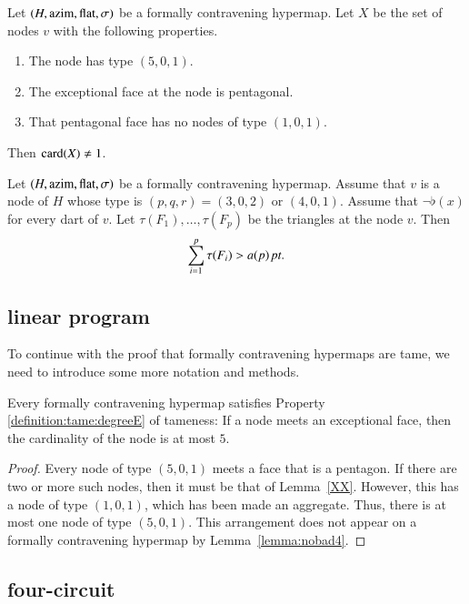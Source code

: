 \begin{lemma}
Let $(H,{\operatorname{azim}},\operatorname{flat},\sigma)$ be a formally contravening hypermap.
Let $X$ be the set of nodes $v$ with the following properties.
    \begin{enumerate}
    \item The node has type $(5,0,1)$.
    \item The exceptional face at the node is pentagonal.
    \item That pentagonal face has no nodes of type $(1,0,1)$.
    \end{enumerate}
Then ${\operatorname{card}}(X)\ne 1$.
\end{lemma}


\begin{lemma}  Let $(H,{\operatorname{azim}},\operatorname{flat},\sigma)$ be a formally contravening
hypermap. Assume that $v$ is a node of $H$ whose type is
$(p,q,r)=(3,0,2)$ or $(4,0,1)$.  Assume that $\neg\flat(x)$ for
every dart of $v$.  Let $\tau(F_1),\ldots,\tau(F_p)$ be the
triangles at the node $v$.  Then
    $$
    \sum_{i=1}^p \tau(F_i) > a(p)\,\hbox{\it pt}.
    $$
\end{lemma}




\subsection{linear program} %
\label{sec:2.2}  To continue with the proof that formally
contravening hypermaps are tame, we need to introduce some more
notation and methods.

\begin{lemma} \label{lemma:deg5}
Every formally contravening hypermap satisfies Property
\ref{definition:tame:degreeE} of tameness: If a node meets an
exceptional face, then the cardinality of the node is at most $5$.
\end{lemma}

\begin{proof} Every node of type $(5,0,1)$ meets a face that is a pentagon.
If there are two or more such nodes, then it must be that of Lemma~\ref{XX}.  
However, this has a node of type $(1,0,1)$, which has been
made an aggregate.  Thus, there is at most one node of type $(5,0,1)$.
This arrangement does not appear on a formally contravening hypermap
by Lemma~\ref{lemma:nobad4}.
\end{proof}

\subsection{four-circuit}

